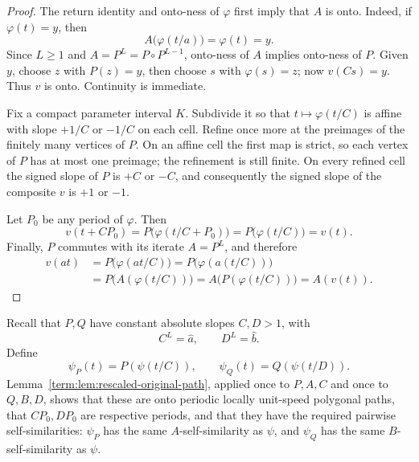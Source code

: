 \documentclass[11pt]{article}
\theoremstyle{definition}
\theoremstyle{remark}
\begin{document}
\begin{proof}
The return identity and onto-ness of \(\varphi\) first imply that \(A\) is
onto.  Indeed, if \(\varphi(t)=y\), then
\[
 A\bigl(\varphi(t/a)\bigr)=\varphi(t)=y.
\]
Since \(L\geq1\) and \(A=P^L=P\circ P^{L-1}\), onto-ness of \(A\) implies
onto-ness of \(P\).  Given \(y\), choose \(z\) with \(P(z)=y\), then choose
\(s\) with \(\varphi(s)=z\); now \(v(Cs)=y\).  Thus \(v\) is onto.
Continuity is immediate.

Fix a compact parameter interval \(K\).  Subdivide it so that
\(t\mapsto\varphi(t/C)\) is affine with slope \(+1/C\) or \(-1/C\) on each
cell.  Refine once more at the preimages of the finitely many vertices of
\(P\).  On an affine cell the first map is strict, so each vertex of \(P\)
has at most one preimage; the refinement is still finite.  On every refined
cell the signed slope of \(P\) is \(+C\) or \(-C\), and consequently the
signed slope of the composite \(v\) is \(+1\) or \(-1\).

Let \(P_0\) be any period of \(\varphi\).  Then
\[
 v(t+CP_0)
 =P\bigl(\varphi(t/C+P_0)\bigr)
 =P\bigl(\varphi(t/C)\bigr)
 =v(t).
\]
Finally, \(P\) commutes with its iterate \(A=P^L\), and therefore
\[
\begin{split}
 v(at)
 &=P\bigl(\varphi(at/C)\bigr)
  =P\bigl(\varphi(a(t/C))\bigr)\\
 &=P\bigl(A(\varphi(t/C))\bigr)
  =A\bigl(P(\varphi(t/C))\bigr)
  =A(v(t)).
\end{split}
\]
\end{proof}

Recall that \(P,Q\) have constant absolute slopes \(C,D>1\), with
\begin{equation}\label{term:eq:root-slopes}
 C^L=\widehat a,\qquad D^L=\widehat b.
\end{equation}
Define
\[
 \psi_P(t)=P(\psi(t/C)),\qquad
 \psi_Q(t)=Q(\psi(t/D)).
\]
Lemma~\ref{term:lem:rescaled-original-path}, applied once to \(P,A,C\) and
once to \(Q,B,D\), shows that these are onto periodic locally unit-speed
polygonal paths, that \(CP_0,DP_0\) are respective periods, and that they
have the required pairwise self-similarities: \(\psi_P\) has the same
\(A\)-self-similarity as \(\psi\), and \(\psi_Q\) has the same
\(B\)-self-similarity as \(\psi\).
\end{document}
